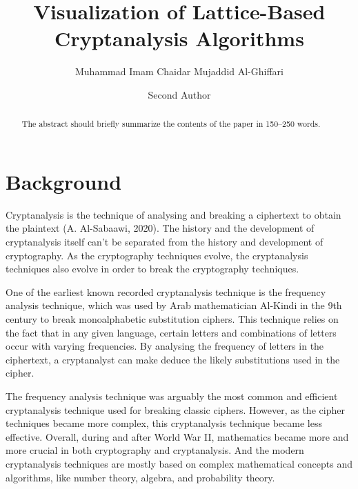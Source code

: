 \documentclass[runningheads]{llncs}
\begin{document}
%
\title{Visualization of Lattice-Based Cryptanalysis Algorithms}
%
%
\author{Muhammad Imam Chaidar Mujaddid Al-Ghiffari \and
Second Author}
%
%
%
\maketitle              %
%
\begin{abstract}
The abstract should briefly summarize the contents of the paper in
150--250 words.

\end{abstract}
%
%
%
\section{Background}

Cryptanalysis is the technique of analysing and breaking a ciphertext to obtain the plaintext (A. Al-Sabaawi, 2020). The history and the development of cryptanalysis itself can't be separated from the history and development of cryptography. As the cryptography techniques evolve, the cryptanalysis techniques also evolve in order to break the cryptography techniques. 

One of the earliest known recorded cryptanalysis technique is the frequency analysis technique, which was used by Arab mathematician Al-Kindi in the 9th century to break monoalphabetic substitution ciphers. This technique relies on the fact that in any given language, certain letters and combinations of letters occur with varying frequencies. By analysing the frequency of letters in the ciphertext, a cryptanalyst can make deduce the likely substitutions used in the cipher.

The frequency analysis technique was arguably the most common and efficient cryptanalysis technique used for breaking classic ciphers. However, as the cipher techniques became more complex, this cryptanalysis technique became less effective. Overall, during and after World War II, mathematics became more and more crucial in both cryptography and cryptanalysis. And the modern cryptanalysis techniques are mostly based on complex mathematical concepts and algorithms, like number theory, algebra, and probability theory.
\end{document}
